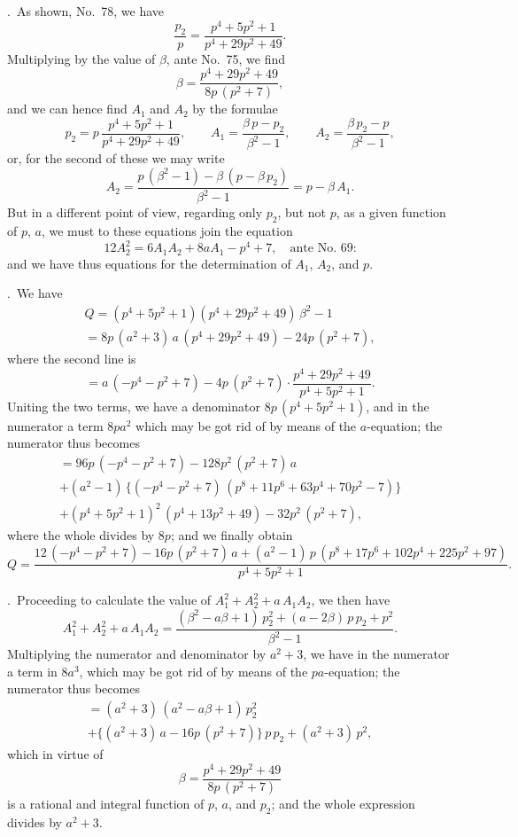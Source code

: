 \documentclass[11pt,a4paper]{book}
\begin{document}
\bigskip{}.\ As shown, No.\ 78, we have
\[
\frac{p_{2}}{p} = \frac{p^{4} + 5p^{2} + 1}{p^{4} + 29p^{2} + 49}.
\]
Multiplying by the value of $\beta$, ante No.\ 75, we find
\[
\beta = \frac{p^{4} + 29p^{2} + 49}{8p\,(p^{2}+7)},
\]
and we can hence find $A_{1}$ and $A_{2}$ by the formulae
\[
p_{2} = p\,\frac{p^{4} + 5p^{2} + 1}{p^{4} + 29p^{2} + 49}, \qquad
A_{1} = \frac{\beta\,p - p_{2}}{\beta^{2}-1}, \qquad
A_{2} = \frac{\beta\,p_{2} - p}{\beta^{2}-1},
\]
or, for the second of these we may write
\[
A_{2} = \frac{p\,(\beta^{2}-1) - \beta\,(p - \beta\,p_{2})}{\beta^{2}-1} = p - \beta\,A_{1}.
\]
But in a different point of view, regarding only $p_{2}$, but not $p$, as a given function of $p$, $a$, we must to these equations join the equation
\[
12A_{2}^{2} = 6A_{1}A_{2} + 8aA_{1} - p^{4} + 7, \quad \text{ante No.\ 69:}
\]
and we have thus equations for the determination of $A_{1}$, $A_{2}$, and $p$.

\bigskip{}.\ We have
\begin{multline*}
Q = (p^{4} + 5p^{2} + 1)(p^{4} + 29p^{2} + 49)\,\beta^{2} - 1 \\
= 8p\,(a^{2}+3)\,a\,(p^{4} + 29p^{2} + 49) - 24p\,(p^{2}+7),
\end{multline*}
where the second line is
\[
= a\,(-p^{4} - p^{2} + 7) - 4p\,(p^{2}+7) \cdot \frac{p^{4} + 29p^{2} + 49}{p^{4} + 5p^{2} + 1}.
\]
Uniting the two terms, we have a denominator $8p\,(p^{4}+5p^{2}+1)$, and in the numerator a term $8pa^{2}$ which may be got rid of by means of the $a$-equation; the numerator thus becomes
\begin{multline*}
= 96p\,(-p^{4} - p^{2} + 7) - 128p^{2}\,(p^{2}+7)\,a \\
+ (a^{2}-1)\,\{(-p^{4}-p^{2}+7)\,(p^{8} + 11p^{6} + 63p^{4} + 70p^{2} - 7)\} \\
+ (p^{4} + 5p^{2} + 1)^{2}\,(p^{4} + 13p^{2} + 49) - 32p^{2}\,(p^{2}+7),
\end{multline*}
where the whole divides by $8p$; and we finally obtain
\[
Q = \frac{12\,(-p^{4} - p^{2} + 7) - 16p\,(p^{2}+7)\,a + (a^{2}-1)\,p\,(p^{8} + 17p^{6} + 102p^{4} + 225p^{2} + 97)}{p^{4} + 5p^{2} + 1}.
\]

\bigskip{}.\ Proceeding to calculate the value of $A_{1}^{2} + A_{2}^{2} + a\,A_{1}A_{2}$, we then have
\[
A_{1}^{2} + A_{2}^{2} + a\,A_{1}A_{2} = \frac{(\beta^{2} - a\beta + 1)\,p_{2}^{2} + (a - 2\beta)\,p\,p_{2} + p^{2}}{\beta^{2} - 1}.
\]
Multiplying the numerator and denominator by $a^{2} + 3$, we have in the numerator a term in $8a^{3}$, which may be got rid of by means of the $pa$-equation; the numerator thus becomes
\begin{multline*}
= (a^{2} + 3)\,(a^{2} - a\beta + 1)\,p_{2}^{2} \\
+ \{(a^{2} + 3)\,a - 16p\,(p^{2}+7)\}\,p\,p_{2} + (a^{2}+3)\,p^{2},
\end{multline*}
which in virtue of
\[
\beta = \frac{p^{4} + 29p^{2} + 49}{8p\,(p^{2}+7)}
\]
is a rational and integral function of $p$, $a$, and $p_{2}$; and the whole expression divides by $a^{2} + 3$.
\end{document}
